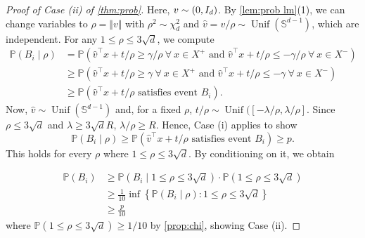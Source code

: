 \documentclass[aoap]{imsart}
\numberwithin{equation}{section}
\theoremstyle{definition}
\theoremstyle{remark}
\newcommand{\N}{\mathbb{N}}
\renewcommand{\hat}{\widehat}
\numberwithin{equation}{section}
\renewcommand{\S}{\mathbb{S}}
\newcommand{\0}{\mathbf{0}}
\newcommand{\1}{\mathbf{1}}
\renewcommand{\P}{\mathbb{P}}
\renewcommand{\S}{\mathbb{S}}
\DeclareMathOperator{\Unif}{Unif}
\let \N \relax
\DeclareMathOperator{\N}{N}
\numberwithin{equation}{section}
\begin{document}
\begin{proof}[Proof of Case (ii) of \cref{thm:prob}]
Here, $v\sim \N(0, I_{d})$. By \cref{lem:prob lm}(1), we can change variables to $\rho = \Vert v\Vert$ with $\rho^2\sim \chi^2_d$ and $\hat{v}=v/\rho\sim \Unif(\S^{d-1})$, which are independent. For any $1\leq \rho\leq 3\sqrt{d}$, we compute
\begin{align*}
\P(B_i\mid \rho) & = \P\left(\hat{v}^{\intercal}x+t/\rho \geq \gamma/\rho \ \forall \ x\in X^+ \text{ and } \hat{v}^{\intercal}x+t/\rho \leq -\gamma/\rho \ \forall \ x\in X^-\right)
\\ & \geq \P\left(\hat{v}^{\intercal}x+t/\rho \geq \gamma \ \forall \ x\in X^+ \text{ and } \hat{v}^{\intercal}x+t/\rho \leq -\gamma \ \forall \ x\in X^-\right)
\\ & \geq \P\left(\hat{v}^{\intercal}x+t/\rho\text{ satisfies event }B_i\right).
\end{align*}
Now, $\hat{v}\sim\Unif(\S^{d-1})$ and, for a fixed $\rho$, $t/\rho \sim \Unif([-\lambda/\rho, \lambda/\rho]$. Since $\rho\leq 3\sqrt{d}$ and $\lambda\geq 3\sqrt{d}R$, $\lambda/\rho\geq R$. Hence, Case (i) applies to show 
\[ \P(B_i\mid \rho) \geq \P\left(\hat{v}^{\intercal}x+t/\rho\text{ satisfies event }B_i\right) \geq p.\]
This holds for every $\rho$ where $1\leq\rho\leq 3\sqrt{d}$. By conditioning on it, we obtain

\begin{align*}
	\P(B_i) & \geq \P\left(B_i\mid 1\leq \rho\leq 3\sqrt{d}\right)\cdot \P\left(1\leq \rho\leq 3\sqrt{d}\right)
	\\ & \geq \frac{1}{10}\inf\left\lbrace \P(B_i\mid\rho) : {1\leq \rho\leq 3\sqrt{d}}\right\rbrace 
	\\ & \geq \frac{p}{10}
\end{align*}
where $ \P(1\leq \rho\leq 3\sqrt{d})\geq 1/10$ by \cref{prop:chi}, showing Case (ii).
\end{proof}
\end{document}

